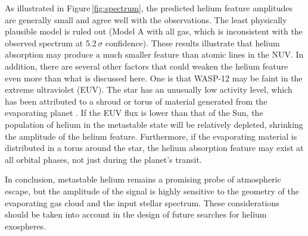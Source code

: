 \documentclass[RNAAS]{aastex62}
\begin{document}
As illustrated in Figure\,\ref{fig:spectrum}, the predicted helium feature
amplitudes are generally small and agree well with the observations. 
The least physically plausible model is ruled out (Model A with all gas, which is
inconsistent with the observed spectrum at 5.2\,$\sigma$ confidence). These
results illustrate that helium absorption may produce a much smaller feature
than atomic lines in the NUV.  In addition, there are several other factors that could weaken the helium feature even
more than what is discussed here.  One is that WASP-12 may be faint in the extreme ultraviolet (EUV). The star has
an unusually low activity level, which has been attributed to a shroud or torus of
material generated from the evaporating planet \citep{haswell17, debrecht18}. If the EUV flux
is lower than that of the Sun, the population of helium in the metastable state
will be relatively depleted, shrinking the amplitude of the helium feature.
Furthermore, if the evaporating material is distributed  in a torus around the
star, the helium absorption feature may exist at all orbital phases, not
just during the planet's transit.

In conclusion, metastable helium remains a promising probe of atmospheric
escape, but the amplitude of the signal is highly sensitive to the geometry of
the evaporating gas cloud and the input stellar spectrum.  These considerations should be taken into account in the design of future searches for helium exospheres.

 






\end{document}
